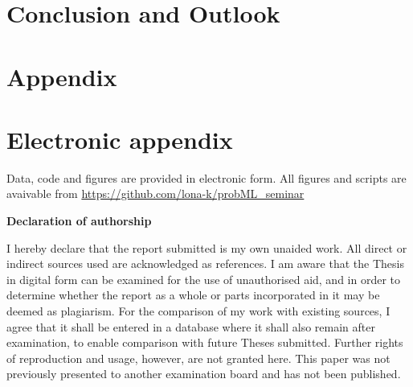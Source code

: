 \documentclass[12pt]{article}
\begin{document}
\section{Conclusion and Outlook}
\label{sec:conclusion}


\newpage



\setcounter{page}{5} %

\appendix

\section{Appendix}
\label{sec:app}

\newpage

\section{Electronic appendix}
\label{sec:el_app}

Data, code and figures are provided in electronic form. All figures and scripts are avaivable from \url{https://github.com/lona-k/probML_seminar}

\newpage


\RaggedRight


\newpage


\Large
\noindent
\textbf{Declaration of authorship}
\vspace{0.5cm}
\noindent
\normalsize

I hereby declare that the report submitted is my own unaided work. All direct
or indirect sources used are acknowledged as references. I am aware that the
Thesis in digital form can be examined for the use of unauthorised aid, and in
order to determine whether the report as a whole or parts incorporated in it may
be deemed as plagiarism. For the comparison of my work with existing sources, I
agree that it shall be entered in a database where it shall also remain after
examination, to enable comparison with future Theses submitted. Further rights
of reproduction and usage, however, are not granted here. This paper was not
previously presented to another examination board and has not been published.
\\
\end{document}
